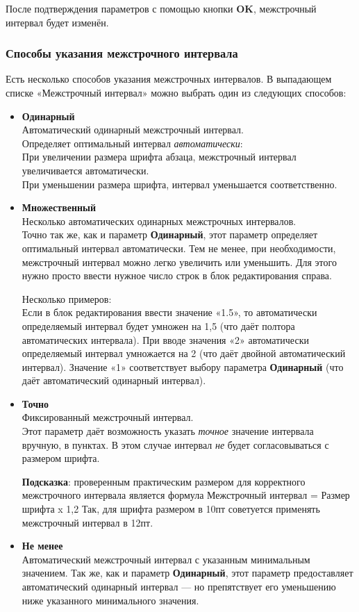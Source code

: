 ﻿\documentclass[a4paper,10pt]{article}
\begin{document}
После подтверждения параметров с помощью кнопки \textbf{OK}, межстрочный интервал будет изменён.

\subsubsection{Способы указания межстрочного интервала}
Есть несколько способов указания межстрочных интервалов. В выпадающем списке «Межстрочный интервал» можно выбрать один из следующих способов:
\begin{itemize}
 \item \textbf{Одинарный}\\
 Автоматический одинарный межстрочный интервал.\\
Определяет оптимальный интервал \textit{автоматически}:\\
При увеличении размера шрифта абзаца,  межстрочный интервал увеличивается автоматически.\\
При уменьшении размера шрифта, интервал уменьшается соответственно.
\item \textbf{Множественный}\\
Несколько автоматических одинарных межстрочных интервалов.\\
Точно так же, как и параметр \textbf{Одинарный}, этот параметр определяет оптимальный интервал автоматически. Тем не менее, при необходимости, межстрочный интервал можно легко увеличить или уменьшить. Для этого нужно просто ввести нужное число строк в блок редактирования справа.

Несколько примеров:\\
Если в блок редактирования ввести значение «1.5», то автоматически определяемый интервал будет умножен на 1,5 (что даёт полтора автоматических интервала).
При вводе значения «2» автоматически определяемый интервал умножается на 2 (что даёт двойной автоматический интервал).
Значение «1» соответствует выбору параметра \textbf{Одинарный} (что даёт автоматический одинарный интервал).
\item \textbf{Точно}\\
Фиксированный межстрочный интервал.\\
Этот параметр даёт возможность указать \textit{точное} значение интервала вручную, в пунктах. В этом случае интервал \textit{не} будет согласовываться с размером шрифта.

\textbf{Подсказка}: проверенным практическим размером для корректного межстрочного интервала является формула Межстрочный интервал = Размер шрифта x 1,2
Так, для шрифта размером в 10пт советуется применять межстрочный интервал в 12пт.
\item \textbf{Не менее}\\
Автоматический межстрочный интервал с указанным минимальным значением.
Так же, как и параметр \textbf{Одинарный}, этот параметр предоставляет автоматический одинарный интервал — но препятствует его уменьшению ниже указанного минимального значения.


\end{itemize}
\end{document}
